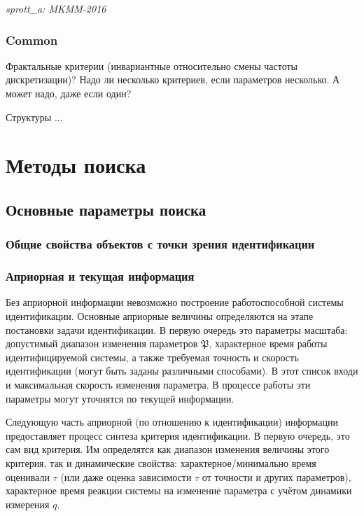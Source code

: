 \documentclass[a4paper,12pt]{article}
\newcommand{\LinkRef}[1]{ \textit{#1} }
\begin{document}
\LinkRef{
  sprott\_a: MKMM-2016
}


\FloatBarrier
\subsubsection{Common}

Фрактальные критерии (инвариантные относительно смены частоты дискретизации)?
Надо ли несколько критериев, если параметров несколько.
А может надо, даже если один?

Структуры ...



\FloatBarrier
\section{Методы поиска}

\subsection{Основные параметры поиска}


\subsubsection{Общие свойства объектов с точки зрения идентификации}

\subsubsection{Априорная и текущая информация}

Без априорной информации невозможно построение
работоспособной системы идентификации. Основные
априорные величины определяются на этапе постановки
задачи идентификации. В первую очередь это
параметры масштаба: допустимый диапазон
изменения параметров \( \mathfrak{P}\),
характерное время работы
идентифицируемой системы, а также
требуемая точность и скорость идентификации
(могут быть заданы различными способами).
В этот список входи и максимальная скорость изменения параметра.
В процессе работы эти параметры могут уточнятся по текущей информации.

Следующую часть априорной (по отношению к идентификации) информации
предоставляет процесс синтеза критерия идентификации.
В первую очередь, это сам вид критерия. Им определятся
как диапазон изменения величины этого критерия, так и
динамические свойства: характерное/минимально время
оценивали \(\tau\) (или даже оценка зависимости $\tau$ от точности и других параметров),
характерное время реакции системы на изменение
параметра с учётом динамики измерения \(q\).
\end{document}
